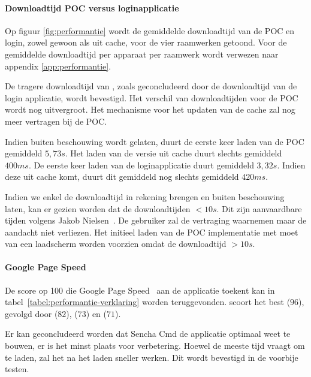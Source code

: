 \paragraph{Downloadtijd POC versus loginapplicatie}
Op figuur \ref{fig:performantie} wordt de gemiddelde downloadtijd van de POC en login, zowel gewoon als uit cache, voor de vier raamwerken getoond.
Voor de gemiddelde downloadtijd per apparaat per raamwerk wordt verwezen naar appendix \ref{app:performantie}.


De tragere downloadtijd van \st{},  zoals geconcludeerd door de downloadtijd van de login applicatie, wordt bevestigd.
Het verschil van downloadtijden voor de POC wordt nog uitvergroot.
Het mechanisme voor het updaten van de cache zal \st{} nog meer vertragen bij de POC.

Indien \st{} buiten beschouwing wordt gelaten, duurt de eerste keer laden van de POC gemiddeld $5,73\unit{s}$. 
Het laden van de versie uit cache duurt slechts gemiddeld $400\unit{ms}$.
De eerste keer laden van de loginapplicatie duurt gemiddeld $3,32\unit{s}$.
Indien deze uit cache komt, duurt dit gemiddeld nog slechts gemiddeld $420\unit{ms}$.


Indien we enkel de downloadtijd in rekening brengen en \st{} buiten beschouwing laten, kan er gezien worden dat de downloadtijden $< 10\unit{s}$.
Dit zijn aanvaardbare tijden volgens Jakob Nielsen~\cite{Nielsen1993}.
De gebruiker zal de vertraging waarnemen maar de aandacht niet verliezen.
Het initieel laden van de POC implementatie met \st{} moet van een laadscherm worden voorzien omdat de downloadtijd $> 10\unit{s}$.


\paragraph{Google Page Speed}
De score op 100 die Google Page Speed~\cite{Morgan2011} aan de applicatie toekent kan in tabel~\ref{tabel:performantie-verklaring} worden teruggevonden.
\st{} scoort het best ($96$),  gevolgd door \lungo{} ($82$),  \kendo{}($73$) en \jqm{}($71$).

Er kan geconcludeerd worden dat Sencha Cmd de applicatie optimaal weet te bouwen,  er is het minst plaats voor verbetering.
Hoewel \st{} de meeste tijd vraagt om te laden, zal het na het laden sneller werken.
Dit wordt bevestigd in de voorbije testen.


